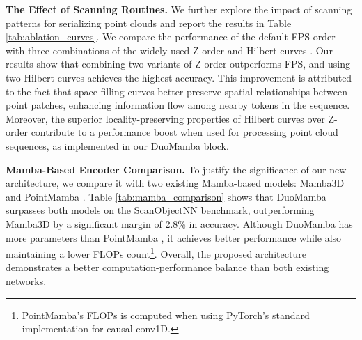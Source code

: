 \vspace{1mm} 
\noindent\textbf{The Effect of Scanning Routines.} We further explore the impact of scanning patterns for serializing point clouds and report the results in Table \ref{tab:ablation_curves}. We compare the performance of the default FPS order with three combinations of the widely used Z-order and Hilbert curves \cite{hilbert_curve}. Our results show that combining two variants of Z-order outperforms FPS, and using two Hilbert curves achieves the highest accuracy. This improvement is attributed to the fact that space-filling curves better preserve spatial relationships between point patches, enhancing information flow among nearby tokens in the sequence. Moreover, the superior locality-preserving properties of Hilbert curves over Z-order \cite{point_trans_v3} contribute to a performance boost when used for processing point cloud sequences, as implemented in our DuoMamba block.

\vspace{1mm} 
\noindent\textbf{Mamba-Based Encoder Comparison.} 
To justify the significance of our new architecture, we compare it with two existing Mamba-based models: Mamba3D \cite{mamba3d} and PointMamba \cite{pointmamba}. Table \ref{tab:mamba_comparison} shows that DuoMamba surpasses both models on the ScanObjectNN \cite{scanobjectnn} benchmark, outperforming Mamba3D \cite{mamba3d} by a significant margin of 2.8\% in accuracy. Although DuoMamba has more parameters than PointMamba \cite{pointmamba}, it achieves better performance while also maintaining a lower FLOPs count\footnote{PointMamba's FLOPs is computed when using PyTorch's standard implementation for causal conv1D.}. Overall, the proposed architecture demonstrates a better computation-performance balance than both existing networks.